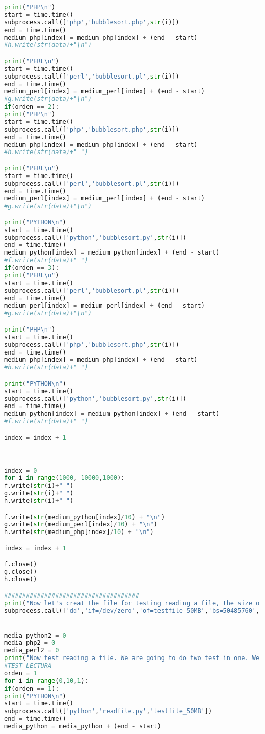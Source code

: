 \begin{lstlisting}[language=python]
print("PHP\n")
start = time.time()
subprocess.call(['php','bubblesort.php',str(i)])
end = time.time()
medium_php[index] = medium_php[index] + (end - start)
#h.write(str(data)+"\n")

print("PERL\n")
start = time.time()
subprocess.call(['perl','bubblesort.pl',str(i)])
end = time.time()
medium_perl[index] = medium_perl[index] + (end - start)
#g.write(str(data)+"\n")
if(orden == 2):
print("PHP\n")
start = time.time()
subprocess.call(['php','bubblesort.php',str(i)])
end = time.time()
medium_php[index] = medium_php[index] + (end - start)
#h.write(str(data)+" ")

print("PERL\n")
start = time.time()
subprocess.call(['perl','bubblesort.pl',str(i)])
end = time.time()
medium_perl[index] = medium_perl[index] + (end - start)
#g.write(str(data)+"\n")

print("PYTHON\n")
start = time.time()
subprocess.call(['python','bubblesort.py',str(i)])
end = time.time()
medium_python[index] = medium_python[index] + (end - start)
#f.write(str(data)+" ")
if(orden == 3):
print("PERL\n")
start = time.time()
subprocess.call(['perl','bubblesort.pl',str(i)])
end = time.time()
medium_perl[index] = medium_perl[index] + (end - start)
#g.write(str(data)+"\n")

print("PHP\n")
start = time.time()
subprocess.call(['php','bubblesort.php',str(i)])
end = time.time()
medium_php[index] = medium_php[index] + (end - start)
#h.write(str(data)+" ")

print("PYTHON\n")
start = time.time()
subprocess.call(['python','bubblesort.py',str(i)])
end = time.time()
medium_python[index] = medium_python[index] + (end - start)
#f.write(str(data)+" ")

index = index + 1



index = 0
for i in range(1000, 10000,1000):
f.write(str(i)+" ")
g.write(str(i)+" ")
h.write(str(i)+" ")

f.write(str(medium_python[index]/10) + "\n")
g.write(str(medium_perl[index]/10) + "\n")
h.write(str(medium_php[index]/10) + "\n")

index = index + 1

f.close()
g.close()
h.close()

#####################################
print("Now let's creat the file for testing reading a file, the size of the file is 50MB\n")
subprocess.call(['dd','if=/dev/zero','of=testfile_50MB','bs=50485760','count=1'])


media_python2 = 0
media_php2 = 0
media_perl2 = 0
print("Now test reading a file. We are going to do two test in one. We are going to read from RAM and from HD\n")
#TEST LECTURA
orden = 1
for i in range(0,10,1):
if(orden == 1):
print("PYTHON\n")
start = time.time()
subprocess.call(['python','readfile.py','testfile_50MB'])
end = time.time()
media_python = media_python + (end - start)


\end{lstlisting}

